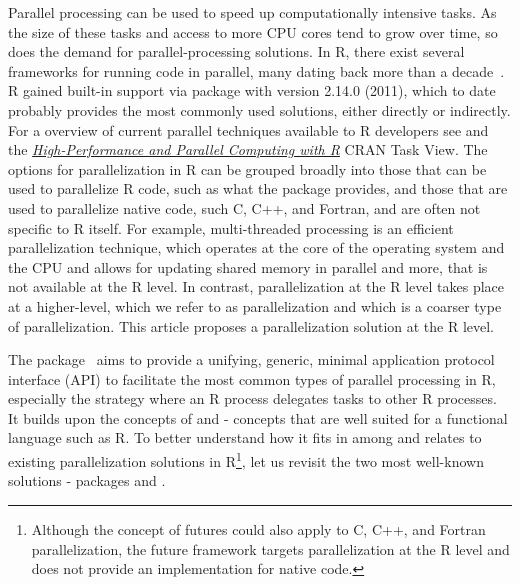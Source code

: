Parallel processing can be used to speed up computationally intensive
tasks.  As the size of these tasks and access to more CPU cores tend
to grow over time, so does the demand for parallel-processing
solutions.  In R, there exist several frameworks for running code in
parallel, many dating back more than a
decade~\citep{Schmidberger2009}.  R gained built-in support
via  package with version 2.14.0 (2011), which to date
probably provides the most commonly used solutions, either directly or
indirectly.  For a overview of current parallel techniques available
to R developers see \citet{Eddelbuettel2020} and the
\href{https://CRAN.R-project.org/view=HighPerformanceComputing}{\emph{High-Performance and Parallel Computing with R}} CRAN Task View.
%
The options for parallelization in R can be grouped broadly into those
that can be used to parallelize R code, such as what
the  package provides, and those that are used to
parallelize native code, such C, C++, and Fortran, and are often not
specific to R itself.  For example, multi-threaded processing is an
efficient parallelization technique, which operates at the core of the
operating system and the CPU and allows for updating shared memory in
parallel and more, that is not available at the R level.  In contrast,
parallelization at the R level takes place at a higher-level, which we
refer to as  parallelization and which is a coarser
type of parallelization.  This article proposes a parallelization
solution at the R level.

The  package~\citep{CRAN:future} aims to provide a
unifying, generic, minimal application protocol interface (API) to
facilitate the most common types of parallel processing in R,
especially the  strategy where an R process
delegates tasks to other R processes. It builds upon the concepts
of  \citep{HewittBaker_1977}
and  \citep{FriedmanWise_1978, Hibbard_1976} - concepts
that are well suited for a functional language such as R.
To better understand how it fits in among and relates to existing
parallelization solutions in R\footnote{Although the concept of
futures could also apply to C, C++, and Fortran parallelization, the
future framework targets parallelization at the R level and does not
provide an implementation for native code.}, let us revisit the two
most well-known solutions - packages 
and .

